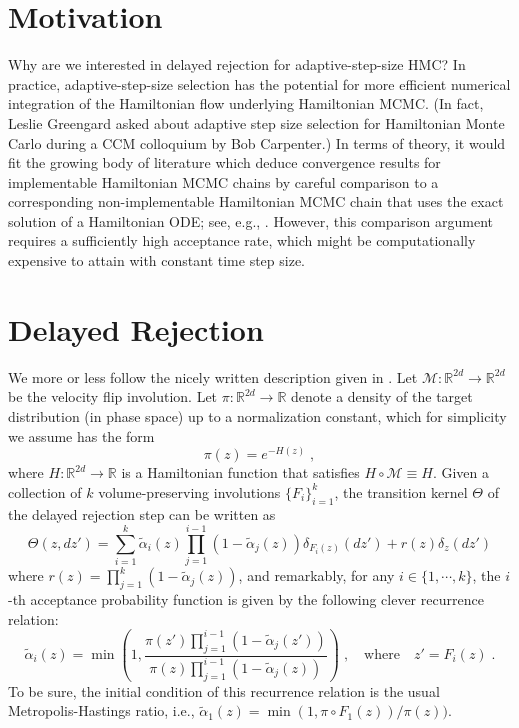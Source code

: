 \documentclass[11pt]{article}
\theoremstyle{plain}%
\begin{document}
\section*{Motivation}

Why are we interested in delayed rejection for adaptive-step-size HMC?  In practice, adaptive-step-size selection has the potential for more efficient numerical integration of the Hamiltonian flow underlying Hamiltonian MCMC. (In fact, Leslie Greengard asked about adaptive step size selection for Hamiltonian Monte Carlo during a CCM colloquium by Bob Carpenter.)  In terms of theory, it would fit the growing body of literature which deduce convergence results for implementable Hamiltonian MCMC chains by careful comparison to a corresponding non-implementable Hamiltonian MCMC chain that uses the exact solution of a Hamiltonian ODE; see, e.g.,  \cite{BouRabeeOberdoerster2023}.  However, this comparison argument requires a sufficiently high acceptance rate, which might be computationally expensive to attain with constant time step size.



\section*{Delayed Rejection}

We more or less follow the nicely written description given in \cite{ChBaCa2023}. 
Let $\mathcal{M}:  \mathbb{R}^{2d} \to  \mathbb{R}^{2d}$ be the velocity flip involution.  Let $\pi: \mathbb{R}^{2d} \to \mathbb{R}$ denote a density of the target distribution (in phase space) up to a normalization constant, which for simplicity we assume has the form \begin{equation} \label{eq:target}
\pi(z) = e^{-H(z)} \;, 
\end{equation} where $H: \mathbb{R}^{2d} \to \mathbb{R}$ is a Hamiltonian function that satisfies $H \circ \mathcal{M} \equiv H$. 
 Given a collection of $k$  volume-preserving involutions $\{ F_i \}_{i=1}^k$, the transition kernel $\Theta$ of the delayed rejection step  can be written as \begin{equation}
\Theta(z, dz') = \sum_{i=1}^k \tilde{\alpha}_i(z) \prod_{j=1}^{i-1} (1-\tilde{\alpha}_j(z)) \delta_{F_i(z)}(dz') + r(z) \delta_{z}(dz')
\end{equation}
where $r(z) = \prod_{j=1}^k (1-\tilde \alpha_j(z))$, and remarkably, for any $i \in \{ 1, \cdots, k \}$, the $i$-th acceptance probability function is given by the following clever recurrence relation: \begin{equation} \label{eq:recurrence}
\tilde \alpha_i (z) = \min\left(1, \dfrac{\pi(z') \prod_{j=1}^{i-1} (1- \tilde \alpha_j(z'))}{\pi(z) \prod_{j=1}^{i-1} (1- \tilde \alpha_j(z))} \right) \;,  \quad \text{where} \quad z' = F_i(z) \;.
\end{equation}
To be sure, the initial condition of this recurrence relation is the usual Metropolis-Hastings ratio, i.e.,  $\tilde \alpha_1 (z) = \min(1, \pi\circ F_1(z))/\pi(z))$.  
\end{document}
